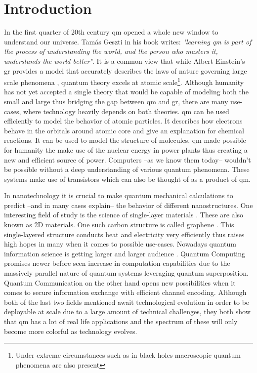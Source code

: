 \section{Introduction}

In the first quarter of 20th century \acrfull{qm} opened a whole new window to understand our universe. Tamás Geszti in his book \cite{geszti2007} writes: \textit{"learning \acrshort{qm} is part of the process of understanding the world, and the person who masters it, understands the world better"}.
It is a common view that while Albert Einstein's \acrfull{gr} provides a model that accurately describes the laws of nature governing large scale phenomena \cite{wald2010general}, quantum theory excels at atomic scale\footnote{Under extreme circumstances such as in black holes macroscopic quantum phenomena are also present}.
Although humanity has not yet accepted a single theory that would be capable of modeling both the small and large thus bridging the gap between \acrshort{qm} and \acrshort{gr}, there are many use-cases, where technology heavily depends on both theories.
\acrshort{qm} can be used efficiently to model the behavior of atomic particles.
It describes how electrons behave in the orbitals around atomic core and give an explanation for chemical reactions.
It can be used to model the structure of molecules.
\acrshort{qm} made possible for humanity the make use of the nuclear energy in power plants thus creating a new and efficient source of power.
Computers --as we know them today-- wouldn't be possible without a deep understanding of various quantum phenomena.
These systems make use of transistors \cite{Ross1998} which can also be thought of as a product of \acrshort{qm}.

In nanotechnology it is crucial to make quantum mechanical calculations to predict --and in many cases explain-- the behavior of different nanostructures.
One interesting field of study is the science of single-layer materials \cite{Zhuang2014}. These are also known as 2D materials.
One such carbon structure is called graphene \cite{Geim2009, Stoller2008, B815239J}.
This single-layered structure conducts heat and electricity very efficiently thus raises high hopes in many when it comes to possible use-cases.
Nowadays quantum information science is getting larger and larger audience \cite{imresandor2004}.
Quantum Computing promises newer before seen increase in computation capabilities due to the massively parallel nature of quantum systems leveraging quantum superposition. Quantum Communication on the other hand opens new possibilities when it comes to secure information exchange with efficient channel encoding.
Although both of the last two fields mentioned await technological evolution in order to be deployable at scale due to a large amount of technical challenges, they both show that \acrshort{qm} has a lot of real life applications and the spectrum of these will only become more colorful as technology evolves.

